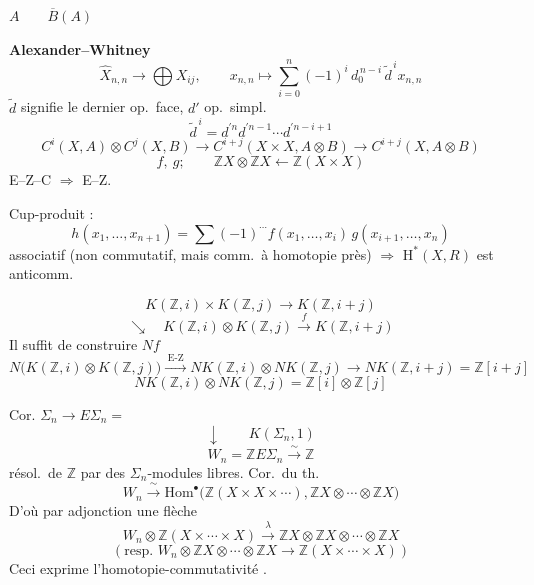 \documentclass[11pt,a4paper]{article}
\begin{document}
$A \qquad \overline{B}(A)$

\textbf{Alexander--Whitney}
\[
\widehat{X}_{n,n} \longrightarrow \bigoplus X_{ij} ,
\qquad
x_{n,n} \longmapsto \sum_{i=0}^{n} (-1)^{i} \, d_0^{\,n-i} \, \tilde{d}^{\,i} x_{n,n}
\]
$\tilde{d}$ signifie le dernier op.\ face, $d'$  op.\ simpl.
\[
\tilde{d}^{\,i} = d^{\prime n} d^{\prime n-1} \cdots d^{\prime n-i+1}
\]
\[
C^i(X , A) \otimes C^j(X , B) \longrightarrow C^{i+j}(X \times X , A \otimes B) \longrightarrow C^{i+j}(X , A \otimes B)
\]
\[
f , \ g ; \qquad \mathbb{Z}X \otimes \mathbb{Z}X \longleftarrow \mathbb{Z}(X \times X)
\]
E--Z--C $\Rightarrow$ E--Z.

Cup-produit :
\[
h(x_1 , \ldots , x_{n+1}) = \sum (-1)^{\cdots} f(x_1 , \ldots , x_i)\, g(x_{i+1} , \ldots , x_n)
\]
associatif (non commutatif, mais comm.\ à homotopie près) $\Rightarrow$ $\mathrm{H}^*(X , R)$ est anticomm.

\[
K(\mathbb{Z} , i) \times K(\mathbb{Z} , j) \longrightarrow K(\mathbb{Z} , i+j)
\]
\[
\searrow \quad K(\mathbb{Z} , i) \otimes K(\mathbb{Z} , j) \xrightarrow{\;f\;} K(\mathbb{Z} , i+j)
\]
Il suffit de construire $Nf$
\[
N\bigl( K(\mathbb{Z} , i) \otimes K(\mathbb{Z} , j) \bigr)
\xrightarrow{\;\mathrm{E\text{-}Z}\;}
N K(\mathbb{Z} , i) \otimes N K(\mathbb{Z} , j)
\longrightarrow N K(\mathbb{Z} , i+j) = \mathbb{Z}[i+j]
\]
\[
N K(\mathbb{Z} , i) \otimes N K(\mathbb{Z} , j) = \mathbb{Z}[i] \otimes \mathbb{Z}[j]
\]


Cor. $\Sigma_n \to E\Sigma_n =$ \struck{\ill{}} \quad {}
\[
\downarrow \qquad K(\Sigma_n , 1)
\]
\[
W_n = \mathbb{Z} E\Sigma_n \xrightarrow{\;\sim\;} \mathbb{Z}
\]
résol.\ de $\mathbb{Z}$ par des $\Sigma_n$-modules  libres.
Cor.\ du th.
\[
W_n \xrightarrow{\;\sim\;} \mathrm{Hom}^\bullet\bigl( \mathbb{Z}(X \times X \times \cdots) , \mathbb{Z}X \otimes \cdots \otimes \mathbb{Z}X \bigr)
\]
D’où par adjonction une flèche
\[
W_n \otimes \mathbb{Z}(X \times \cdots \times X) \xrightarrow{\;\lambda\;} \mathbb{Z}X \otimes \mathbb{Z}X \otimes \cdots \otimes \mathbb{Z}X
\]
\[
(\text{resp.\ } W_n \otimes \mathbb{Z}X \otimes \cdots \otimes \mathbb{Z}X \longrightarrow \mathbb{Z}(X \times \cdots \times X))
\]
Ceci exprime l’homotopie-commutativité  .
\end{document}

